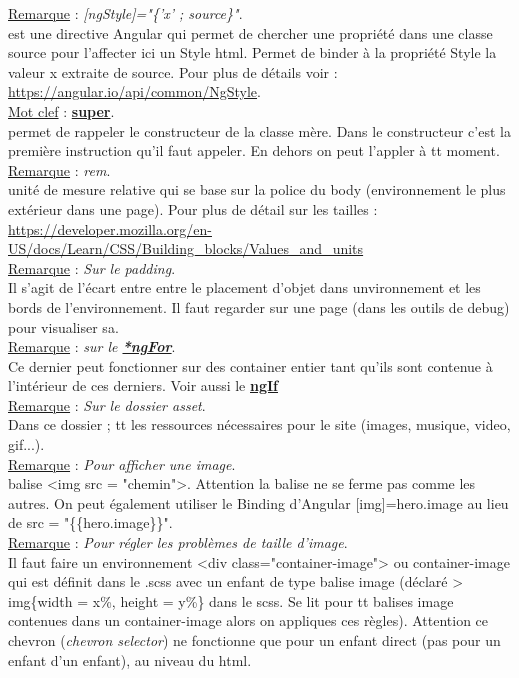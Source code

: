 \documentclass[a4paper,12pt,twoside]{article}
\newcommand{\urlcolor}{magenta}  %
\newcommand{\keycolor}{purple} %
\newcommand{\incode}[1]{{\footnotesize\ttfamily #1}} %
\newcommand{\rem}[2]{\noindent\underline{Remarque} : \textit{#1}.\\ \indent #2}
\newcommand{\keyref}[2]{\hypersetup{urlcolor=\keycolor} \href{#1}{\textbf{#2}}\hypersetup{urlcolor=\urlcolor}}
\newcommand{\keyword}[3]{\noindent\underline{Mot clef} : \keyref{#1}{#2}. \\ \indent #3}
\begin{document}
\rem{[ngStyle]="\{'x' ; source\}"}{ est une directive Angular qui permet de chercher une propriété dans une classe source pour l'affecter ici un Style html. Permet de binder à la propriété Style la valeur x extraite de source. Pour plus de détails voir : \url{https://angular.io/api/common/NgStyle}.}\\

\keyword{https://developer.mozilla.org/fr/docs/Web/JavaScript/Reference/Operators/super}{super}{permet de rappeler le constructeur de la classe mère. Dans le constructeur c'est la première instruction qu'il faut appeler. En dehors on peut l'appler à tt moment.}\\

\rem{rem}{unité de mesure relative qui se base sur la police du body (environnement le plus extérieur dans une page). Pour plus de détail sur les tailles : \url{https://developer.mozilla.org/en-US/docs/Learn/CSS/Building_blocks/Values_and_units}}\\

\rem{Sur le padding}{Il s'agit de l'écart entre entre le placement d'objet dans unvironnement et les bords de l'environnement. Il faut regarder sur une page (dans les outils de debug) pour visualiser sa.}\\

\rem{sur le \keyref{https://angular.io/api/common/NgForOf}{*ngFor}}{Ce dernier peut fonctionner sur des container entier tant qu'ils sont contenue à l'intérieur de ces derniers. Voir aussi le \keyref{https://angular.io/api/common/NgIf}{ngIf}}\\

\rem{Sur le dossier \incode{asset}}{Dans ce dossier ; tt les ressources nécessaires pour le site (images, musique, video, gif...).}\\

\rem{Pour afficher une image}{balise <img src = "chemin">. Attention la balise ne se ferme pas comme les autres. On peut également utiliser le Binding d'Angular [img]=hero.image au lieu de src = "\{\{hero.image\}\}".}\\

\rem{Pour régler les problèmes de taille d'image}{Il faut faire un environnement <div class="container-image"> ou container-image qui est définit dans le .scss avec un enfant de type balise image (déclaré > img\{width = x\%, height = y\%\} dans le scss. Se lit pour tt balises image contenues dans un container-image alors on appliques ces règles). Attention ce chevron (\textit{chevron selector}) ne fonctionne que pour un enfant direct (pas pour un enfant d'un enfant), au niveau du html.}\\
\end{document}
